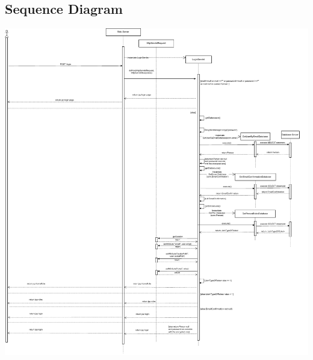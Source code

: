 \subsection{Sequence Diagram}

\includegraphics[width=\columnwidth,height=\textheight]{resources/Sequence_Diagram-drawio-cropped.pdf}

